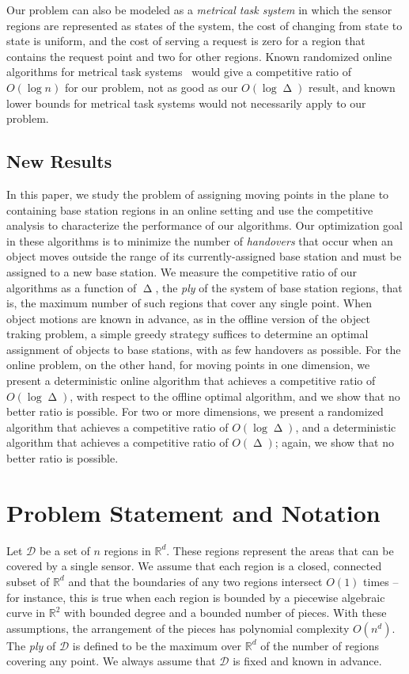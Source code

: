 \documentclass[runningheads]{llncs}
\newcommand {\mathset} [1] {\ensuremath {\mathbb {#1}}}
\newcommand {\R} {\mathset {R}}
\newcommand {\script} [1] {\ensuremath {\mathcal {#1}}}
\DeclareMathOperator {\ply}{\Delta}
\begin{document}
Our problem can also be modeled as a \emph{metrical task system} in which the sensor regions are represented as states of the system, the cost of changing from state to state is uniform, and the cost of serving a request is zero for a region that contains the request point and two for other regions. Known randomized online algorithms for metrical task systems~\cite{IraSei-TCS-98} would give a competitive ratio of $O(\log n)$ for our problem, not as good as our $O(\log\ply)$ result, and known lower bounds for metrical task systems would not necessarily apply to our problem.

\subsection{New Results}
In this paper,
we study the problem of assigning moving points 
in the plane to containing base station regions in an online
setting and use the competitive analysis to characterize the
performance of our algorithms.  
Our optimization goal in these algorithms 
is to minimize the number of \emph{handovers} that occur when 
an object moves outside the range of its currently-assigned base 
station and must be assigned to a new base station. 
We measure the competitive ratio of 
our algorithms as a function of $\ply$, the \emph{ply} of 
the system of base station regions, 
that is, the maximum number of such regions
that cover any single point. 
When object motions are known in advance, 
as in the offline version of the object traking problem, 
a simple greedy strategy 
suffices to determine an optimal assignment of objects to base stations, 
with as few handovers as possible. 
For the online problem, on the other hand,
for moving points in one dimension, we present a deterministic online 
algorithm that achieves a competitive ratio of $O(\log\ply)$, 
with respect to the offline optimal algorithm,
and we show that no better ratio is possible. 
For two or more dimensions, we present a randomized algorithm 
that achieves a competitive ratio of $O(\log\ply)$, 
and a deterministic algorithm that achieves a competitive 
ratio of $O(\ply)$; again, we show that no better ratio is possible.

\section {Problem Statement and Notation} \label {sec:prelims}

Let $\script D$ be a set of $n$ regions in $\R^d$. These regions represent the areas that can be covered by a single sensor. We assume that each region is a closed, connected subset of $\R^d$ and that the boundaries of any two regions intersect $O(1)$ times -- for instance, this is true when each region is bounded by a piecewise algebraic curve in $\R^2$ with bounded degree and a bounded number of pieces. With these assumptions, the arrangement of the pieces has polynomial complexity $O(n^d)$. The \emph {ply} of $\script D$ is defined to be the maximum over $\R^d$ of the number of regions covering any point.  We always assume that $\script D$ is fixed and known in advance.
\end{document}
